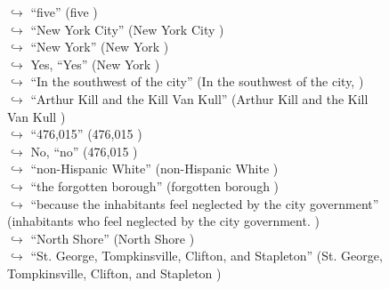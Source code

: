 \documentclass[11pt,a4paper, onecolumn]{article}
\begin{document}
\begin{figure}[t] \small \begin{tcolorbox}[boxsep=0pt,left=5pt,right=0pt,top=2pt,colback = yellow!5] \begin{dialogue}
 \small 
\colorbox{pink!25}{$\hookrightarrow$}
{ ``five'' (five ) }
\\
\colorbox{pink!25}{$\hookrightarrow$}
{ ``New York City'' (New York City ) }
\\
\colorbox{pink!25}{$\hookrightarrow$}
{ ``New York'' (New York ) }
\\
\colorbox{pink!25}{$\hookrightarrow$}
\colorbox{red!25}{Yes,}
{ ``Yes'' (New York ) }
\\
\colorbox{pink!25}{$\hookrightarrow$}
{ ``In the southwest of the city'' (In the southwest of the city, ) }
\\
\colorbox{pink!25}{$\hookrightarrow$}
{ ``Arthur Kill and the Kill Van Kull'' (Arthur Kill and the Kill Van Kull ) }
\\
\colorbox{pink!25}{$\hookrightarrow$}
{ ``476,015'' (476,015 ) }
\\
\colorbox{pink!25}{$\hookrightarrow$}
\colorbox{red!25}{No,}
{ ``no'' (476,015 ) }
\\
\colorbox{pink!25}{$\hookrightarrow$}
{ ``non-Hispanic White'' (non-Hispanic White ) }
\\
\colorbox{pink!25}{$\hookrightarrow$}
{ ``the forgotten borough'' (forgotten borough ) }
\\
\colorbox{pink!25}{$\hookrightarrow$}
{ ``because the inhabitants feel neglected by the city government'' (inhabitants who feel neglected by the city government. ) }
\\
\colorbox{pink!25}{$\hookrightarrow$}
{ ``North Shore'' (North Shore ) }
\\
\colorbox{pink!25}{$\hookrightarrow$}
{ ``St. George, Tompkinsville, Clifton, and Stapleton'' (St. George, Tompkinsville, Clifton, and Stapleton ) }
\\
 \end{dialogue}\end{tcolorbox}\end{figure}
\end{document}

